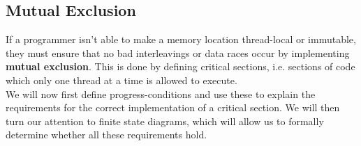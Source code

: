 \documentclass[main]{subfiles}
\begin{document}
\subsection{Mutual Exclusion}
If a programmer isn't able to make a memory location thread-local or immutable, they must ensure that no bad interleavings or data races occur by implementing \textbf{mutual exclusion}. This is done by defining critical sections, i.e. sections of code which only one thread at a time is allowed to execute.\\[3mm]
We will now first define progress-conditions and use these to explain the requirements for the correct implementation of a critical section. We will then turn our attention to finite state diagrams, which will allow us to formally determine whether all these requirements hold. 
\end{document}
